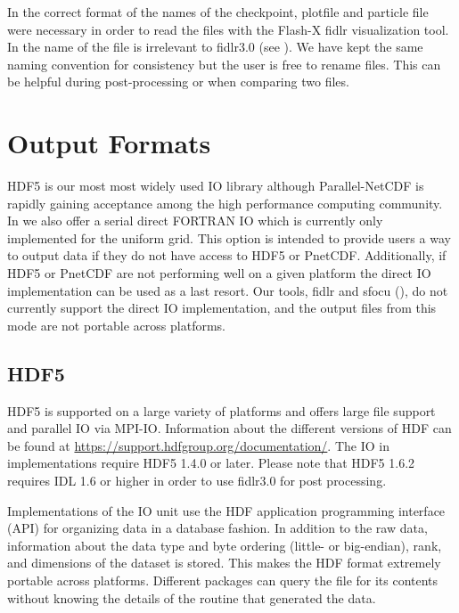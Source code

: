 \begin{flashtip}
In \flashx the correct format of the names of the checkpoint,
plotfile and particle file were necessary in order to read the files
with the Flash-X fidlr visualization tool.  In
\flashx the name of the file is irrelevant to fidlr3.0
(see ).  We have kept
the same naming convention for consistency but the user is free to
rename files.  This can be helpful during post-processing or when comparing
two files.
\end{flashtip}



\section{Output Formats}\label{Sec:Output formats}


HDF5 is our most most widely used IO library although
Parallel-NetCDF is rapidly gaining acceptance among the high
performance computing community.  In \flashx we also offer a serial
direct FORTRAN IO which is currently only implemented for the
uniform grid.  This option is intended to provide users a way to output data
if they do not have access to HDF5 or PnetCDF.  Additionally,
if HDF5 or PnetCDF are not performing well on a given platform the
direct IO implementation can be used as a last resort.  Our tools,
fidlr and sfocu (), do not currently support the
direct IO implementation, and the output files from this mode are not portable
across platforms.



\subsection{HDF5}
\label{Sec:HDF5}
HDF5%
is supported on a large variety of platforms and
offers large file support and parallel IO via MPI-IO.  Information
about the different versions of HDF can be found at
\url{https://support.hdfgroup.org/documentation/}.
The IO in \flashx
implementations require HDF5 1.4.0 or later.  Please note that HDF5
1.6.2 requires IDL 1.6 or higher in order to use fidlr3.0 for post processing.


Implementations of the %
\unit{IO} unit use the
HDF application programming interface (API) for organizing data in a
database fashion.  In addition to the raw data, information about the
data type and byte ordering (little- or big-endian), rank, and
dimensions of the dataset is stored.  This makes the HDF format
extremely portable across platforms.  Different packages can query the
file for its contents without knowing the details of the routine that
generated the data.



